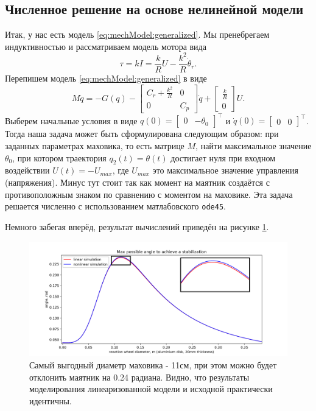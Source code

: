 \documentclass{article}
\begin{document}
\subsection{Численное решение на основе нелинейной модели}
Итак, у нас есть модель \eqref{eq:mechModel:generalized}. Мы пренебрегаем индуктивностью и рассматриваем модель мотора вида
\[
	\tau = kI = \frac{k}{R}U - \frac{k^2}{R} \dot{\theta}_r.
\]
Перепишем модель \eqref{eq:mechModel:generalized} в виде
\[
	M\ddot{q} = -G(q) - \begin{bmatrix} C_r + \frac{k^2}{R}  & 0 \\ 0 & C_p  \end{bmatrix} \dot{q} + \begin{bmatrix}\frac{k}{R} \\ 0 \end{bmatrix}U.
\]
Выберем начальные условия в виде $q(0)=\begin{bmatrix}0 & -\theta_0 \end{bmatrix}^\top$ и $\dot{q}(0)=\begin{bmatrix} 0 & 0 \end{bmatrix}^\top$. Тогда наша задача может быть сформулирована следующим образом: при заданных параметрах маховика, то есть матрице $M$, найти максимальное значение $\theta_0$, при котором траектория $q_2(t) = \theta(t)$ достигает нуля при входном воздействии $U(t)=-U_{max}$, где $U_{max}$ это максимальное значение управления (напряжения). Минус тут стоит так как момент на маятник создаётся с противоположным знаком по сравнению с моментом на маховике. Эта задача решается численно с использованием матлабовского \texttt{ode45}.

Немного забегая вперёд, результат вычислений приведён на рисунке \ref{fig:rwdiameter}.
\begin{figure}[tb]
\centerline{\includegraphics[width=\linewidth]{img/rwsize}}
\caption{Самый выгодный диаметр маховика - 11см, при этом можно будет отклонить маятник на 0.24 радиана.
Видно, что результаты моделирования линеаризованной модели и исходной практически идентичны.
}
\label{fig:rwdiameter}
\end{figure}
\end{document}
